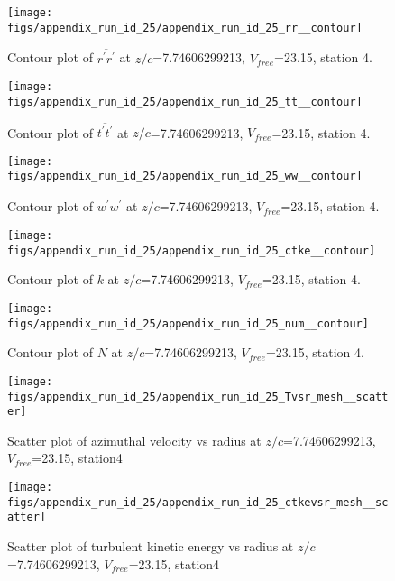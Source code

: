 \begin{figure}[H]
\centering
\texttt{[image: figs/appendix\_run\_id\_25/appendix\_run\_id\_25\_rr\_\_contour]}
\caption{Contour plot of $\overline{r^\prime r^\prime}$ at $z/c$=7.74606299213, $V_{free}$=23.15, station 4.}
\label{fig:appendix_run_id_25_rr__contour}
\end{figure}


\begin{figure}[H]
\centering
\texttt{[image: figs/appendix\_run\_id\_25/appendix\_run\_id\_25\_tt\_\_contour]}
\caption{Contour plot of $\overline{t^\prime t^\prime}$ at $z/c$=7.74606299213, $V_{free}$=23.15, station 4.}
\label{fig:appendix_run_id_25_tt__contour}
\end{figure}


\begin{figure}[H]
\centering
\texttt{[image: figs/appendix\_run\_id\_25/appendix\_run\_id\_25\_ww\_\_contour]}
\caption{Contour plot of $\overline{w^\prime w^\prime}$ at $z/c$=7.74606299213, $V_{free}$=23.15, station 4.}
\label{fig:appendix_run_id_25_ww__contour}
\end{figure}


\begin{figure}[H]
\centering
\texttt{[image: figs/appendix\_run\_id\_25/appendix\_run\_id\_25\_ctke\_\_contour]}
\caption{Contour plot of $k$ at $z/c$=7.74606299213, $V_{free}$=23.15, station 4.}
\label{fig:appendix_run_id_25_ctke__contour}
\end{figure}


\begin{figure}[H]
\centering
\texttt{[image: figs/appendix\_run\_id\_25/appendix\_run\_id\_25\_num\_\_contour]}
\caption{Contour plot of $N$ at $z/c$=7.74606299213, $V_{free}$=23.15, station 4.}
\label{fig:appendix_run_id_25_num__contour}
\end{figure}


\begin{figure}[H]
\centering
\texttt{[image: figs/appendix\_run\_id\_25/appendix\_run\_id\_25\_Tvsr\_mesh\_\_scatter]}
\caption{Scatter plot of azimuthal velocity vs radius at $z/c$=7.74606299213, $V_{free}$=23.15, station4}
\label{fig:appendix_run_id_25_Tvsr_mesh__scatter}
\end{figure}


\begin{figure}[H]
\centering
\texttt{[image: figs/appendix\_run\_id\_25/appendix\_run\_id\_25\_ctkevsr\_mesh\_\_scatter]}
\caption{Scatter plot of turbulent kinetic energy vs radius at $z/c$=7.74606299213, $V_{free}$=23.15, station4}
\label{fig:appendix_run_id_25_ctkevsr_mesh__scatter}
\end{figure}


